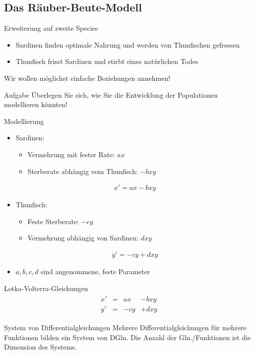 \subsection{Das Räuber-Beute-Modell}
\frame{\subtoc}

\begin{frame}{Erweiterung auf zweite Species}
  \begin{itemize}
  \item Sardinen finden optimale Nahrung und werden von
    Thunfischen gefressen
  \item Thunfisch frisst Sardinen und stirbt eines natürlichen
    Todes
  \end{itemize}
  \pause
  Wir wollen möglichst einfache Beziehungen annehmen!
  \begin{exampleblock}{Aufgabe}
    Überlegen Sie sich, wie Sie die Entwicklung der Populationen
    modellieren könnten!
  \end{exampleblock}
\end{frame}

\begin{frame}{Modellierung}
  \begin{itemize}
  \item<+-> Sardinen:
    \begin{itemize}
    \item Vermehrung mit fester Rate: $ax$
    \item Sterberate abhängig vom Thunfisch: $-bxy$
    \end{itemize}
    \begin{gather*}
      x' = ax-bxy
    \end{gather*}
  \item<+-> Thunfisch:
    \begin{itemize}
    \item Feste Sterberate: $-cy$
    \item Vermehrung abhängig von Sardinen: $dxy$
    \end{itemize}
    \begin{gather*}
      y' = -cy + dxy
    \end{gather*}
  \item<+-> $a,b,c,d$ sind angenommene, feste Parameter
  \end{itemize}
\end{frame}

\begin{frame}{Lotka-Volterra-Gleichungen}
  \begin{gather*}
    \begin{aligned}
      x' &=& ax &-bxy\\
      y' &=& -cy & +dxy
    \end{aligned}
  \end{gather*}

  \begin{block}{System von Differentialgleichungen}
    Mehrere Differentialgleichungen für mehrere Funktionen bilden ein
    System von DGln. Die Anzahl der Gln./Funktionen ist die Dimension
    des Systems.
  \end{block}
\end{frame}

